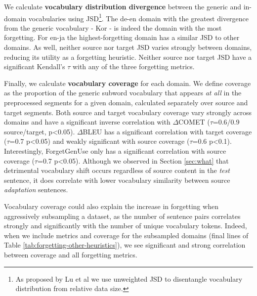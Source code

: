 \documentclass[11pt]{article}
\begin{document}

We calculate \textbf{vocabulary distribution divergence} between the generic and in-domain vocabularies  using JSD\footnote{As proposed by Lu et al  we use unweighted JSD to disentangle vocabulary distribution from relative data size.}. The de-en domain with the greatest divergence from the generic vocabulary - Kor - is indeed the domain with the most forgetting. For en-ja the highest-forgetting domain has a similar JSD to other domains. As well, neither source nor target JSD varies strongly between domains, reducing its utility as a forgetting heuristic. Neither source nor target JSD have a significant Kendall's $\tau$ with any of the three forgetting metrics.



Finally, we calculate \textbf{vocabulary coverage} for each domain. We define coverage as the proportion of the generic subword vocabulary that appears \emph{at all} in the preprocessed segments for a given domain, calculated separately over source and target segments.  Both source and target vocabulary coverage vary strongly across domains and have a significant inverse correlation with $\Delta$COMET ($\tau$=0.6/0.9 source/target, p<0.05). $\Delta$BLEU has a significant correlation with target coverage ($\tau$=0.7  p<0.05) and weakly significant with source coverage ($\tau$=0.6  p<0.1).  
Interestingly, ForgetGenUse only has a significant correlation with source coverage ($\tau$=0.7  p<0.05). Although we observed in Section \ref{sec:what} that detrimental vocabulary shift occurs regardless of source content in the \emph{test} sentence, it does correlate with lower vocabulary similarity between source \emph{adaptation} sentences.

Vocabulary coverage could also explain the increase in forgetting when aggressively subsampling a dataset, as the number of sentence pairs correlates strongly and significantly with the number of unique vocabulary tokens. Indeed, when we include metrics and coverage for the subsampled domains 
(final lines of Table \ref{tab:forgetting-other-heuristics}), we see significant and strong correlation between coverage and all forgetting metrics.
\end{document}
